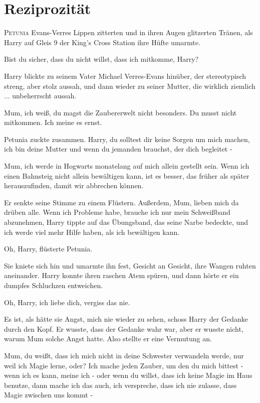 \chapter{Reziprozität}

\lettrine{P}{etunia} Evans-Verres Lippen zitterten und in ihren Augen glitzerten
Tränen, als Harry auf Gleis 9 der King's Cross Station ihre Hüfte umarmte.

\glqq Bist du sicher, dass du nicht willst, dass ich mitkomme, Harry?\grqq{}

Harry blickte zu seinem Vater Michael Verres-Evans hinüber, der stereotypisch
streng, aber stolz aussah, und dann wieder zu seiner Mutter, die wirklich
ziemlich ... unbeherrscht aussah.

\glqq Mum, ich weiß, du magst die Zaubererwelt nicht besonders. Du musst nicht
mitkommen. Ich meine es ernst.\grqq{}

Petunia zuckte zusammen. \glqq Harry, du solltest dir keine Sorgen um mich
machen, ich bin deine Mutter und wenn du jemanden brauchst, der dich begleitet
-\grqq{}

\glqq Mum, ich werde in Hogwarts monatelang auf mich allein gestellt sein. Wenn
ich einen Bahnsteig nicht allein bewältigen kann, ist es besser, das früher als
später herauszufinden, damit wir abbrechen können.\grqq{}

Er senkte seine Stimme zu einem Flüstern. \glqq Außerdem, Mum, lieben mich da
drüben alle. Wenn ich Probleme habe, brauche ich nur mein Schweißband
abzunehmen\grqq{}, Harry tippte auf das Übungsband, das seine Narbe bedeckte,
\glqq und ich werde viel mehr Hilfe haben, als ich bewältigen kann.\grqq{}

\glqq Oh, Harry\grqq{}, flüsterte Petunia.

Sie kniete sich hin und umarmte ihn fest, Gesicht an Gesicht, ihre Wangen ruhten
aneinander. Harry konnte ihren raschen Atem spüren, und dann hörte er ein
dumpfes Schluchzen entweichen.

\glqq Oh, Harry, ich liebe dich, vergiss das nie.\grqq{}

Es ist, als hätte sie Angst, mich nie wieder zu sehen, schoss Harry der Gedanke
durch den Kopf. Er wusste, dass der Gedanke wahr war, aber er wusste nicht,
warum Mum solche Angst hatte. Also stellte er eine Vermutung an.

\glqq Mum, du weißt, dass ich mich nicht in deine Schwester verwandeln werde,
nur weil ich Magie lerne, oder? Ich mache jeden Zauber, um den du mich bittest -
wenn ich es kann, meine ich - oder wenn du willst, dass ich keine Magie im Haus
benutze, dann mache ich das auch, ich verspreche, dass ich nie zulasse, dass
Magie zwischen uns kommt -\grqq{}


